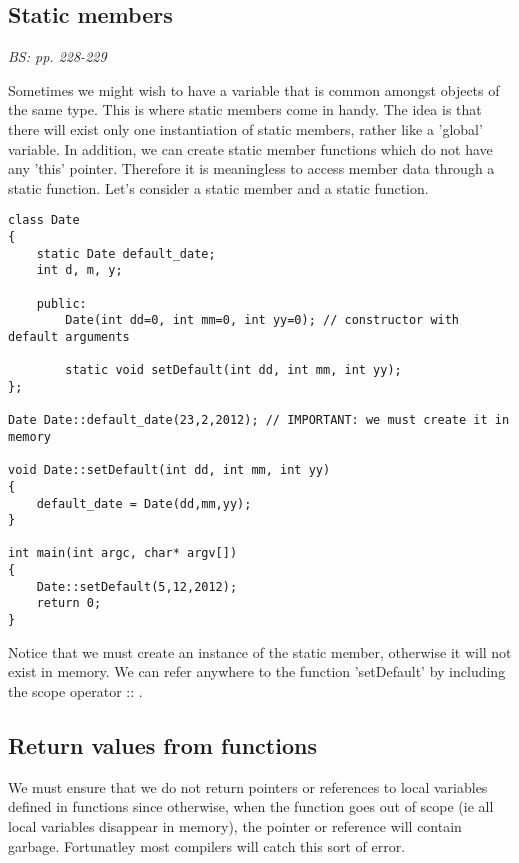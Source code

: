 \subsection{Static members}

\emph{BS: pp. 228-229}

Sometimes we might wish to have a variable that is common amongst objects of the same type. This is where static members come in handy. The idea is that there will exist only one instantiation of static members, rather like a 'global' variable. In addition, we can create static member functions which do not have any 'this' pointer. Therefore it is meaningless to access member data through a static function. Let's consider a static member and a static function.
\begin{lstlisting}[label=static,caption=Static members]
class Date
{
	static Date default_date;
	int d, m, y;
	
	public:
		Date(int dd=0, int mm=0, int yy=0);	// constructor with default arguments
		
		static void setDefault(int dd, int mm, int yy);
};

Date Date::default_date(23,2,2012);	// IMPORTANT: we must create it in memory

void Date::setDefault(int dd, int mm, int yy)
{
	default_date = Date(dd,mm,yy);
}

int main(int argc, char* argv[])
{
	Date::setDefault(5,12,2012);
	return 0;
}
\end{lstlisting}
Notice that we must create an instance of the static member, otherwise it will not exist in memory. We can refer anywhere to the function 'setDefault' by including the scope operator :: . 

\subsection{Return values from functions}

We must ensure that we do not return pointers or references to local variables defined in functions since otherwise, when the function goes out of scope (ie all local variables disappear in memory), the pointer or reference will contain garbage. Fortunatley most compilers will catch this sort of error.

